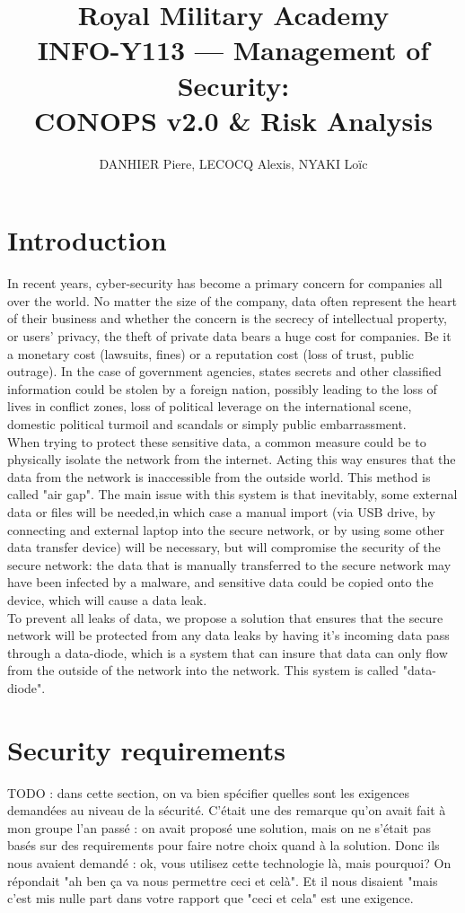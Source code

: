 \documentclass[a4paper,11pt]{article}
\title{Royal Military Academy\\
	INFO-Y113 --- Management of Security: \\
	CONOPS v2.0 \& Risk Analysis}
\author{DANHIER Piere, LECOCQ Alexis, NYAKI Loïc}
\begin{document}
\maketitle
\newpage
\tableofcontents

\newpage

\section{Introduction}
In recent years, cyber-security has become a primary concern for companies all over the world. No matter the size of the company, data often represent the heart of their business and whether the concern is the secrecy of intellectual property, or users' privacy, the theft of private data bears a huge cost for companies. Be it a monetary cost (lawsuits, fines) or a reputation cost (loss of trust, public outrage). In the case of government agencies, states secrets and other classified information could be stolen by a foreign nation, possibly leading to the loss of lives in conflict zones, loss of political leverage on the international scene, domestic political turmoil and scandals or simply public embarrassment.\\

When trying to protect these sensitive data, a common measure could be to physically isolate the network from the internet. Acting this way ensures that the data from the network is inaccessible from the outside world. This method is called "air gap". The main issue with this system is that inevitably, some external data or files will be needed,in which case a manual import (via USB drive, by connecting and external laptop into the secure network, or by using some other data transfer device) will be necessary, but will compromise the security of the secure network: the data that is manually transferred to the secure network may have been infected by a malware, and sensitive data could be copied onto the device, which will cause a data leak.\\

To prevent all leaks of data, we propose a solution that ensures that the secure network will be protected from any data leaks by having it's incoming data pass through a data-diode, which is a system that can insure that data can only flow from the outside of the network into the network. This system is called "data-diode".

\section{Security requirements}
TODO : dans cette section, on va bien spécifier quelles sont les exigences demandées au niveau de la sécurité. C'était une des remarque qu'on avait fait à mon groupe l'an passé : on avait proposé une solution, mais on ne s'était pas basés sur des requirements pour faire notre choix quand à la solution. Donc ils nous avaient demandé : ok, vous utilisez cette technologie là, mais pourquoi? On répondait "ah ben ça va nous permettre ceci et celà". Et il nous disaient "mais c'est mis nulle part dans votre rapport que "ceci et cela" est une exigence.\\
\end{document}
